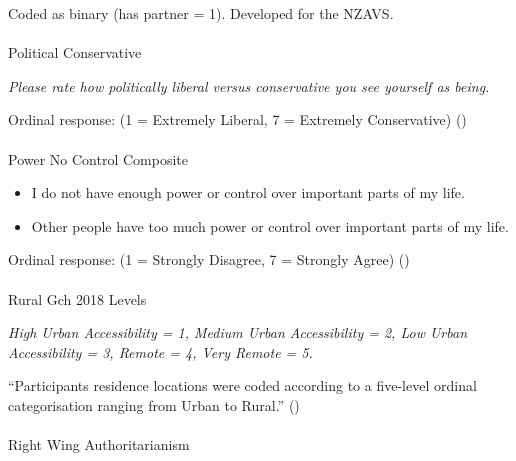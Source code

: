 \documentclass[
  single column]{article}
\makeatletter
\let\oldparagraph\paragraph
\renewcommand{\paragraph}{
    \@ifstar
      \xxxParagraphStar
      \xxxParagraphNoStar
  }
\newcommand{\xxxParagraphStar}[1]{\oldparagraph*{#1}\mbox{}}
\newcommand{\xxxParagraphNoStar}[1]{\oldparagraph{#1}\mbox{}}
\providecommand{\tightlist}{%
  \setlength{\itemsep}{0pt}\setlength{\parskip}{0pt}}\usepackage{longtable,booktabs,array}
\makeatother
\begin{document}
Coded as binary (has partner = 1). Developed for the NZAVS.

\paragraph{Political Conservative}\label{political-conservative}

\emph{Please rate how politically liberal versus conservative you see
yourself as being.}

Ordinal response: (1 = Extremely Liberal, 7 = Extremely Conservative)
()

\paragraph{Power No Control Composite}\label{power-no-control-composite}

\begin{itemize}
\tightlist
\item
  I do not have enough power or control over important parts of my life.
\item
  Other people have too much power or control over important parts of my
  life.
\end{itemize}

Ordinal response: (1 = Strongly Disagree, 7 = Strongly Agree)
()

\paragraph{Rural Gch 2018 Levels}\label{rural-gch-2018-levels}

\emph{High Urban Accessibility = 1, Medium Urban Accessibility = 2, Low
Urban Accessibility = 3, Remote = 4, Very Remote = 5.}

``Participants residence locations were coded according to a five-level
ordinal categorisation ranging from Urban to Rural.''
()

\paragraph{Right Wing
Authoritarianism}\label{right-wing-authoritarianism}
\end{document}
